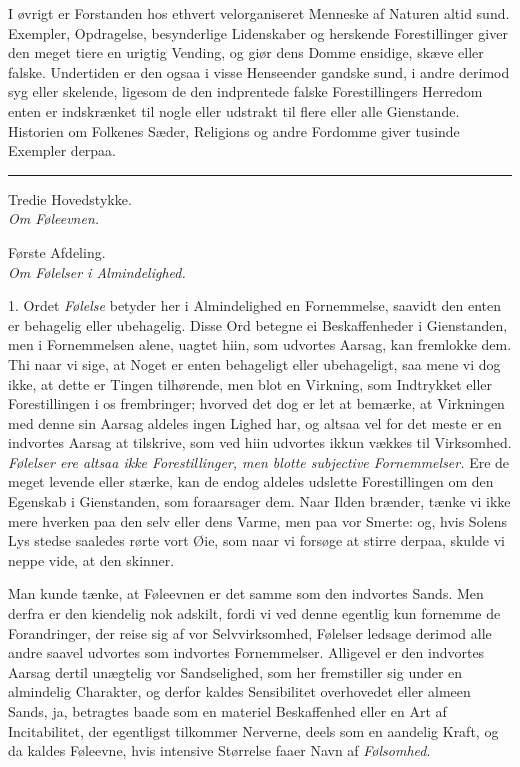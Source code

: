 \documentclass[12pt,a4paper]{article}
\newcommand{\hovedstykke}[2]{%
  \bigskip\begin{center}{\Large #1}\\[6pt]{\large \emph{#2}}\end{center}\smallskip}
\newcommand{\afdeling}[2]{%
  \medskip\begin{center}{\large #1}\\[4pt]{\emph{#2}}\end{center}\smallskip}
\newcommand{\opage}[1]{\marginnote{\footnotesize\textit{[#1]}}}
\begin{document}
\opage{188} I øvrigt er Forstanden hos ethvert velorganiseret Menneske af Naturen altid sund.
Exempler, Opdragelse, besynderlige Lidenskaber og herskende Forestillinger giver den meget
tiere en urigtig Vending, og giør dens Domme ensidige, skæve eller falske. Undertiden er
den ogsaa i visse Henseender gandske sund, i andre derimod syg eller skelende, ligesom de
den indprentede falske Forestillingers Herredom enten er indskrænket til nogle eller
udstrakt til flere eller alle Gienstande. Historien om Folkenes Sæder, Religions og andre
Fordomme giver tusinde Exempler derpaa.

\bigskip
\begin{center}\rule{0.35\textwidth}{0.4pt}\end{center}

\hovedstykke{Tredie Hovedstykke.}{Om Føleevnen.}

\afdeling{Første Afdeling.}{Om Følelser i Almindelighed.}

1. Ordet \emph{Følelse} betyder her i Almindelighed en Fornemmelse, saavidt den enten er
behagelig eller ubehagelig. Disse Ord betegne ei Beskaffenheder i Gienstanden, men i
Fornemmelsen alene, uagtet hiin, som
\opage{189} udvortes Aarsag, kan fremlokke dem. Thi naar vi sige, at Noget er enten behageligt eller
ubehageligt, saa mene vi dog ikke, at dette er Tingen tilhørende, men blot en Virkning,
som Indtrykket eller Forestillingen i os frembringer; hvorved det dog er let at bemærke,
at Virkningen med denne sin Aarsag aldeles ingen Lighed har, og altsaa vel for det meste
er en indvortes Aarsag at tilskrive, som ved hiin udvortes ikkun vækkes til Virksomhed.
\emph{Følelser ere altsaa ikke Forestillinger, men blotte subjective Fornemmelser.} Ere de
meget levende eller stærke, kan de endog aldeles udslette Forestillingen om den Egenskab i
Gienstanden, som foraarsager dem. Naar Ilden brænder, tænke vi ikke mere hverken paa den
selv eller dens Varme, men paa vor Smerte: og, hvis Solens Lys stedse saaledes rørte vort
Øie, som naar vi forsøge at stirre derpaa, skulde vi neppe vide, at den skinner.

Man kunde tænke, at Føleevnen er det samme som den indvortes Sands. Men derfra er den
kiendelig nok adskilt, fordi vi ved denne egentlig kun fornemme de Forandringer, der reise
sig af vor Selvvirksomhed, Følelser ledsage derimod alle andre saavel udvortes som
indvortes Fornemmelser. Alligevel er den indvortes Aarsag dertil unægtelig vor
Sandselighed, som her fremstiller sig under en almindelig Charakter, og derfor kaldes
Sensibilitet overhovedet eller almeen Sands, ja, betragtes baade som en materiel
Beskaffenhed eller en
\opage{190} Art af Incitabilitet, der egentligst tilkommer Nerverne, deels som en aandelig Kraft, og
da kaldes Føleevne, hvis intensive Størrelse faaer Navn af \emph{Følsomhed}.
\end{document}
